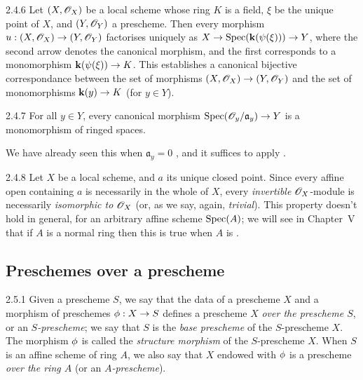 \documentclass[10pt,oneside]{book}
\begin{document}
\begin{envs}[Corollary]{2.4.6}
\label{cor-1.2.4.6}
Let $(X,\mathscr{O}_X)$ be a local scheme whose ring $K$ is a field, $\xi$ be the unique point of
$X$, and $(Y,\mathscr{O}_Y)$ a prescheme. Then every morphism $u:(X,\mathscr{O}_X)\to(Y,\mathscr{O}_Y)$ factorises
uniquely as $X\to{\mathop{\mathrm{Spec}}\nolimits}(\mathbf{k}(\psi(\xi)))\to Y$, where the second arrow denotes the canonical
morphism, and the first corresponds to a monomorphism $\mathbf{k}(\psi(\xi))\to K$.
This establishes a canonical bijective correspondance between the set of
morphisms $(X,\mathscr{O}_X)\to (Y,\mathscr{O}_Y)$ and the set of monomorphisms $\mathbf{k}(y)\to K$ (for
$y\in Y$).
\end{envs}
    
\begin{envs}[Corollary]{2.4.7}
\label{cor-1.2.4.7}
For all $y\in Y$, every canonical morphism
${\mathop{\mathrm{Spec}}\nolimits}(\mathscr{O}_y/\mathfrak{a}_y)\to Y$ is a monomorphism of ringed spaces.
\end{envs}
    
We have already seen this when $\mathfrak{a}_y=0$ , and it suffices
to apply .
    
\begin{env}[Remark]{2.4.8}
\label{rmk-1.2.4.8}
Let $X$ be a local scheme, and $a$ its unique
closed point.  Since every affine open containing $a$ is necessarily in the
whole of $X$, every \emph{invertible} $\mathscr{O}_X$-module  is
necessarily \emph{isomorphic to $\mathscr{O}_X$} (or, as we say, again, \emph{trivial}).
This property doesn't hold in general, for an arbitrary affine scheme
${\mathop{\mathrm{Spec}}\nolimits}(A)$; we will see in Chapter~V that if $A$ is a normal ring then this is
true when $A$ is .
\end{env}

\subsection{Preschemes over a prescheme}
\label{1-schemes-2.5}

\begin{envs}[Definition]{2.5.1}
\label{defn-1.2.5.1}
Given a prescheme $S$, we say that the data of a
prescheme $X$ and a morphism of preschemes $\phi:X\to S$ defines a
prescheme $X$ \emph{over the prescheme $S$}, or an \emph{$S$-prescheme}; we say
that $S$ is the \emph{base prescheme} of the $S$-prescheme $X$. The morphism
$\phi$ is called the \emph{structure morphism} of the $S$-prescheme $X$.
When $S$ is an affine scheme of ring $A$, we also say that $X$ endowed with
$\phi$ is a prescheme \emph{over the ring $A$} (or an \emph{$A$-prescheme}).
\end{envs}
\end{document}
